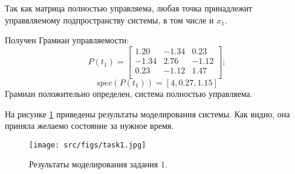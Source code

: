 Так как матрица полностью управляема, любая точка принадлежит управвляемому подпространству системы, в том числе и \(x_1\).

Получен Грамиан управляемости:
\[
        P(t_1) = \begin{bmatrix}
        1.20 & -1.34 & 0.23 \\
        -1.34 & 2.76 & -1.12 \\
        0.23 & -1.12 & 1.47 \\
        \end{bmatrix};
\]
\[
        spec(P(t_1)) = [4, 0.27, 1.15]
\]Грамиан положительно определен, система полностью управляема.

На рисунке \ref{fig:task1} приведены результаты моделирования системы. Как видно, она приняла желаемо состояние за нужное время.
\begin{figure}[ht!]
        \centering
        \texttt{[image: src/figs/task1.jpg]}
        \caption{Результаты моделирования задания 1.}
        \label{fig:task1}
\end{figure}


